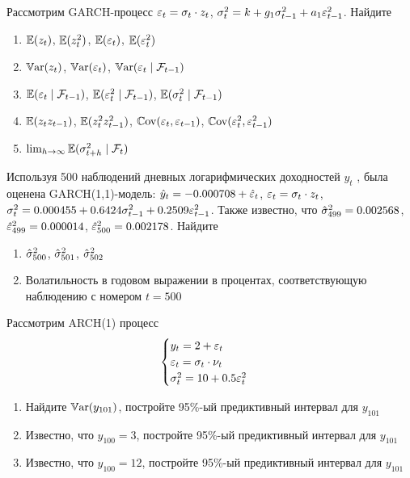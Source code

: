 \begin{problem}
Рассмотрим GARCH-процесс $\varepsilon_t=\sigma_t \cdot z_t$, $\sigma^2_t=k+g_1\sigma^2_{t-1}+a_1\varepsilon^2_{t-1}$. Найдите
\begin{enumerate}
\item $\operatorname{\mathbb{E}}(z_t)$, $\operatorname{\mathbb{E}}(z_t^2)$, $\operatorname{\mathbb{E}}(\varepsilon_t)$, $\operatorname{\mathbb{E}}(\varepsilon_t^2)$
\item $\operatorname{\mathbb{V}\mathrm{ar}}(z_t)$, $\operatorname{\mathbb{V}\mathrm{ar}}(\varepsilon_t)$, $\operatorname{\mathbb{V}\mathrm{ar}}(\varepsilon_t \mid \mathcal{F}_{t-1})$
\item $\operatorname{\mathbb{E}}(\varepsilon_t \mid \mathcal{F}_{t-1})$, $\operatorname{\mathbb{E}}(\varepsilon_t^2 \mid \mathcal{F}_{t-1})$, $\operatorname{\mathbb{E}}(\sigma^2_t \mid \mathcal{F}_{t-1})$
\item $\operatorname{\mathbb{E}}(z_tz_{t-1})$, $\operatorname{\mathbb{E}}(z_t^2z_{t-1}^2)$, $\operatorname{\mathbb{C}\mathrm{ov}}(\varepsilon_t,\varepsilon_{t-1})$, $\operatorname{\mathbb{C}\mathrm{ov}}(\varepsilon_t^2,\varepsilon_{t-1}^2)$
\item $\lim_{h\to\infty} \operatorname{\mathbb{E}}(\sigma^2_{t+h} \mid \mathcal{F}_t)$
\end{enumerate}


\begin{sol}
\end{sol}
\end{problem}



\begin{problem}
Используя 500 наблюдений дневных логарифмических доходностей $y_t$ ,
была оценена GARCH(1,1)-модель: $\hat{y}_t=-0.000708+\hat{\varepsilon}_t$, $\varepsilon_t=\sigma_t \cdot z_t$, $\sigma^2_t=0.000455+0.6424\sigma^2_{t-1}+0.2509\varepsilon^2_{t-1}$. Также известно, что $\hat{\sigma}^2_{499}=0.002568$, $\hat{\varepsilon}^2_{499}=0.000014$, $\hat{\varepsilon}^2_{500}=0.002178$.
Найдите
\begin{enumerate}
\item  $\hat{\sigma}^2_{500}$, $\hat{\sigma}^2_{501}$, $\hat{\sigma}^2_{502}$
\item Волатильность в годовом выражении в процентах, соответствующую
наблюдению с номером $t = 500$
\end{enumerate}


\begin{sol}
\end{sol}
\end{problem}


\begin{problem}
Рассмотрим ARCH(1) процесс
\[
\begin{cases}
y_t = 2 + \varepsilon_t \\
\varepsilon_t = \sigma_t \cdot \nu_t \\
\sigma^2_t = 10 + 0.5\varepsilon_t^2
\end{cases}
\]

\begin{enumerate}
\item Найдите $\operatorname{\mathbb{V}\mathrm{ar}}(y_{101})$, постройте 95\%-ый предиктивный интервал для $y_{101}$
\item Известно, что $y_{100}=3$, постройте 95\%-ый предиктивный интервал для $y_{101}$
\item Известно, что $y_{100}=12$, постройте 95\%-ый предиктивный интервал для $y_{101}$
\end{enumerate}


\begin{sol}
\end{sol}
\end{problem}

